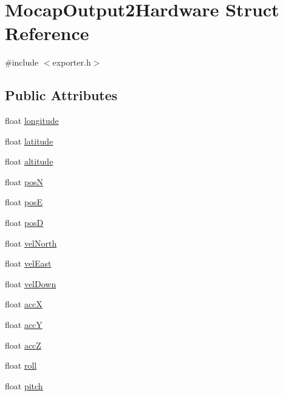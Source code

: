 \hypertarget{struct_mocap_output2_hardware}{\section{\-Mocap\-Output2\-Hardware \-Struct \-Reference}
\label{struct_mocap_output2_hardware}
}


{\ttfamily \#include $<$exporter.\-h$>$}

\subsection*{\-Public \-Attributes}
\begin{DoxyCompactItemize}
\item 
float \hyperlink{group___mo_cap_plugin_ga65a9de4b87de2a4aaff0760f2b912407}{longitude}
\item 
float \hyperlink{group___mo_cap_plugin_gacfbf5cf513abfc200b4fd5c14dad294c}{latitude}
\item 
float \hyperlink{group___mo_cap_plugin_ga6f5725506a151cfd49e1c6b80c2e948f}{altitude}
\item 
float \hyperlink{group___mo_cap_plugin_ga75792a6a49b67e8d7b63a219ca0f2ed2}{pos\-N}
\item 
float \hyperlink{group___mo_cap_plugin_gaeb486e47d519b624cd7b598eb6f33169}{pos\-E}
\item 
float \hyperlink{group___mo_cap_plugin_ga60ef031584e000727250ea18e4e0ce36}{pos\-D}
\item 
float \hyperlink{group___mo_cap_plugin_gadfa715081f6bc74af7efc32c39d720f2}{vel\-North}
\item 
float \hyperlink{group___mo_cap_plugin_gaa2d1409fe871a4dd45265e2412d53f67}{vel\-East}
\item 
float \hyperlink{group___mo_cap_plugin_ga2ffad0e2c72a914bb6f9ff031aeb9b79}{vel\-Down}
\item 
float \hyperlink{group___mo_cap_plugin_ga34811521a55099df3d905b19ab544638}{acc\-X}
\item 
float \hyperlink{group___mo_cap_plugin_gad47738d7c1cd424f7d9508b4d44a4043}{acc\-Y}
\item 
float \hyperlink{group___mo_cap_plugin_gae919304b20a26d362f67b32533118ce7}{acc\-Z}
\item 
float \hyperlink{group___mo_cap_plugin_ga6db93cd0e529bbfcb33af3293ab16c62}{roll}
\item 
float \hyperlink{group___mo_cap_plugin_ga5e6750ec09f6ef2ebd014c746421e952}{pitch}
\item 

\end{DoxyCompactItemize}
